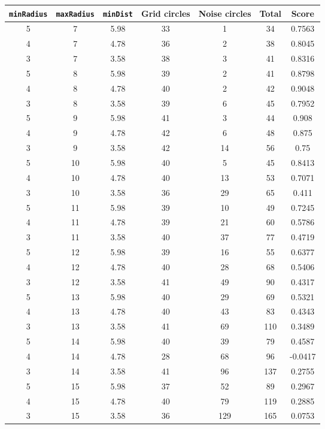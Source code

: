 \documentclass[letterpaper, 12pt]{article}
\begin{document}
\begin{longtable}{|c|c|c|c|c|c|c|}
\hline
\textbf{\texttt{minRadius}} & \textbf{\texttt{maxRadius}} & \textbf{\texttt{minDist}} & \textbf{Grid circles} & \textbf{Noise circles} & \textbf{Total} & \textbf{Score} \\
\hline
5 & 7 & 5.98 & 33 & 1 & 34 & 0.7563 \\
\hline
4 & 7 & 4.78 & 36 & 2 & 38 & 0.8045 \\
\hline
3 & 7 & 3.58 & 38 & 3 & 41 & 0.8316 \\
\hline
5 & 8 & 5.98 & 39 & 2 & 41 & 0.8798 \\
\hline
4 & 8 & 4.78 & 40 & 2 & 42 & 0.9048 \\
\hline
3 & 8 & 3.58 & 39 & 6 & 45 & 0.7952 \\
\hline
5 & 9 & 5.98 & 41 & 3 & 44 & 0.908 \\
\hline
4 & 9 & 4.78 & 42 & 6 & 48 & 0.875 \\
\hline
3 & 9 & 3.58 & 42 & 14 & 56 & 0.75 \\
\hline
5 & 10 & 5.98 & 40 & 5 & 45 & 0.8413 \\
\hline
4 & 10 & 4.78 & 40 & 13 & 53 & 0.7071 \\
\hline
3 & 10 & 3.58 & 36 & 29 & 65 & 0.411 \\
\hline
5 & 11 & 5.98 & 39 & 10 & 49 & 0.7245 \\
\hline
4 & 11 & 4.78 & 39 & 21 & 60 & 0.5786 \\
\hline
3 & 11 & 3.58 & 40 & 37 & 77 & 0.4719 \\
\hline
5 & 12 & 5.98 & 39 & 16 & 55 & 0.6377 \\
\hline
4 & 12 & 4.78 & 40 & 28 & 68 & 0.5406 \\
\hline
3 & 12 & 3.58 & 41 & 49 & 90 & 0.4317 \\
\hline
5 & 13 & 5.98 & 40 & 29 & 69 & 0.5321 \\
\hline
4 & 13 & 4.78 & 40 & 43 & 83 & 0.4343 \\
\hline
3 & 13 & 3.58 & 41 & 69 & 110 & 0.3489 \\
\hline
5 & 14 & 5.98 & 40 & 39 & 79 & 0.4587 \\
\hline
4 & 14 & 4.78 & 28 & 68 & 96 & -0.0417 \\
\hline
3 & 14 & 3.58 & 41 & 96 & 137 & 0.2755 \\
\hline
5 & 15 & 5.98 & 37 & 52 & 89 & 0.2967 \\
\hline
4 & 15 & 4.78 & 40 & 79 & 119 & 0.2885 \\
\hline
3 & 15 & 3.58 & 36 & 129 & 165 & 0.0753 \\

\end{longtable}
\end{document}
